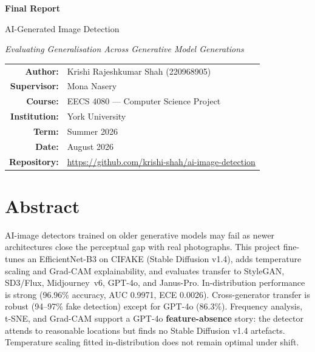 \documentclass[12pt,a4paper]{article}
\begin{document}
\begin{titlepage}
\centering
\vspace*{2.5cm}
{\Huge\bfseries Final Report\par}
\vspace{1cm}
{\LARGE AI-Generated Image Detection\par}
\vspace{0.5cm}
{\large\itshape Evaluating Generalisation Across Generative Model Generations\par}
\vspace{2.5cm}

\begin{tabular}{rl}
\textbf{Author:}      & Krishi Rajeshkumar Shah (220968905) \\
\textbf{Supervisor:}   & Mona Nasery \\
\textbf{Course:}       & EECS 4080 --- Computer Science Project \\
\textbf{Institution:}  & York University \\
\textbf{Term:}         & Summer 2026 \\
\textbf{Date:}         & August 2026 \\
\textbf{Repository:}   & \url{https://github.com/krishi-shah/ai-image-detection} \\
\end{tabular}

\vfill
\end{titlepage}

\tableofcontents
\newpage

\section{Abstract}

AI-image detectors trained on older generative models may fail as newer architectures close the perceptual gap with real photographs. This project fine-tunes an EfficientNet-B3 on CIFAKE (Stable Diffusion v1.4), adds temperature scaling and Grad-CAM explainability, and evaluates transfer to StyleGAN, SD3/Flux, Midjourney~v6, GPT-4o, and Janus-Pro. In-distribution performance is strong (96.96\% accuracy, AUC 0.9971, ECE 0.0026). Cross-generator transfer is robust (94--97\% fake detection) except for GPT-4o (86.3\%). Frequency analysis, t-SNE, and Grad-CAM support a GPT-4o \textbf{feature-absence} story: the detector attends to reasonable locations but finds no Stable Diffusion v1.4 artefacts. Temperature scaling fitted in-distribution does not remain optimal under shift.
\end{document}
